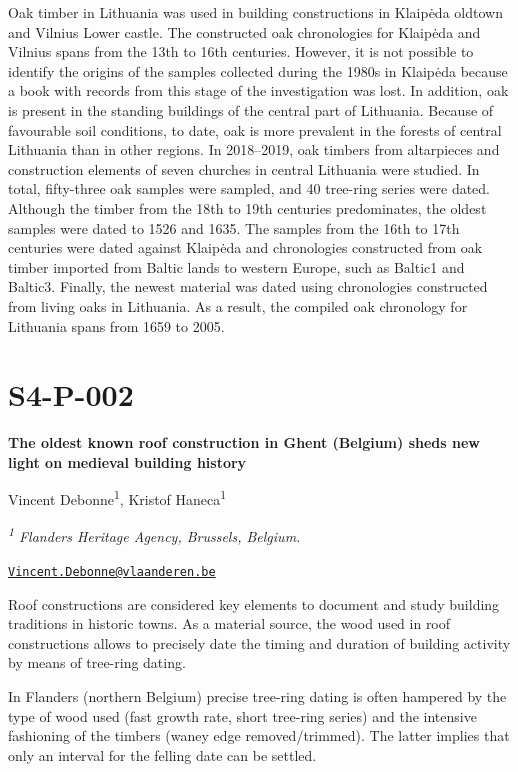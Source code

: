 \documentclass[
]{book}
\begin{document}
Oak timber in Lithuania was used in building constructions in Klaipėda oldtown and Vilnius Lower castle. The constructed oak chronologies for Klaipėda and Vilnius spans from the 13th to 16th centuries. However, it is not possible to identify the origins of the samples collected during the 1980s in Klaipėda because a book with records from this stage of the investigation was lost. In addition, oak is present in the standing buildings of the central part of Lithuania. Because of favourable soil conditions, to date, oak is more prevalent in the forests of central Lithuania than in other regions. In 2018--2019, oak timbers from altarpieces and construction elements of seven churches in central Lithuania were studied. In total, fifty-three oak samples were sampled, and 40 tree-ring series were dated. Although the timber from the 18th to 19th centuries predominates, the oldest samples were dated to 1526 and 1635. The samples from the 16th to 17th centuries were dated against Klaipėda and chronologies constructed from oak timber imported from Baltic lands to western Europe, such as Baltic1 and Baltic3. Finally, the newest material was dated using chronologies constructed from living oaks in Lithuania. As a result, the compiled oak chronology for Lithuania spans from 1659 to 2005.

\hypertarget{s4-p-002}{%
\section*{S4-P-002}\label{s4-p-002}}

\textbf{The oldest known roof construction in Ghent (Belgium) sheds new light on medieval building history}

Vincent Debonne\textsuperscript{1}, Kristof Haneca\textsuperscript{1}

\emph{\textsuperscript{1} Flanders Heritage Agency, Brussels, Belgium.}

\href{mailto:Vincent.Debonne@vlaanderen.be}{\nolinkurl{Vincent.Debonne@vlaanderen.be}}

Roof constructions are considered key elements to document and study building traditions in historic towns. As a material source, the wood used in roof constructions allows to precisely date the timing and duration of building activity by means of tree-ring dating.

In Flanders (northern Belgium) precise tree-ring dating is often hampered by the type of wood used (fast growth rate, short tree-ring series) and the intensive fashioning of the timbers (waney edge removed/trimmed). The latter implies that only an interval for the felling date can be settled.
\end{document}
